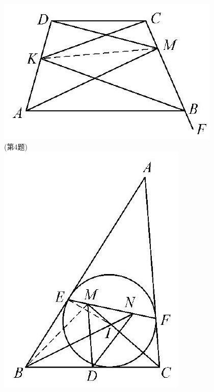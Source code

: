 \documentclass[10pt]{article}
\begin{document}
\includegraphics[max width=\textwidth, center]{2024_10_30_66b8e5e701da2093c133g-096}\\
(第4题)\\
\includegraphics[max width=\textwidth, center]{2024_10_30_66b8e5e701da2093c133g-096(2)}\\
\end{document}
